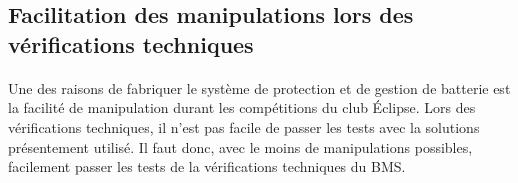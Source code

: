 	\subsection{Facilitation des manipulations lors des vérifications techniques}

		\paragraph{}
		Une des raisons de fabriquer le système de protection et de gestion de batterie est la facilité de manipulation durant les compétitions du club Éclipse. Lors des vérifications techniques, il n’est pas facile de passer les tests avec la solutions présentement utilisé. Il faut donc, avec le moins de manipulations possibles, facilement passer les tests de la vérifications techniques du BMS.

